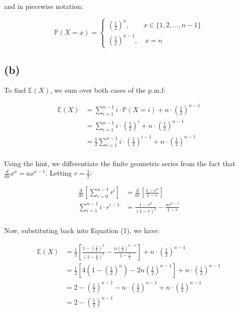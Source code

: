 \documentclass[12pt]{article}
\begin{document}
\noindent and in piecewise notation: 

\begin{equation*}
    \boxed{\mathbb{P}(X = x) = \begin{cases}
        \left(\displaystyle\frac{1}{2}\right)^{x}, \qquad x \in \{1, 2, \dots , n-1\} \\ 
        \left(\displaystyle\frac{1}{2}\right)^{x-1}, \quad x = n
    \end{cases}}
\end{equation*}


\subsection*{(b)}
To find $ \mathbb{E}(X)$, we sum over both cases of the p.m.f:

\begin{align}
    \mathbb{E}(X) &= \sum_{i=1}^{n-1} i \cdot \mathbb{P}(X = i) + n \cdot \left(\frac{1}{2}\right)^{n-1} \\ \nonumber
    &= \sum_{i=1}^{n-1} i \cdot \left(\frac{1}{2}\right)^{i} + n \cdot \left(\frac{1}{2}\right)^{n-1} \\ \nonumber
    &= \frac{1}{2 }\sum_{i=1}^{n-1} i \cdot \left(\frac{1}{2}\right)^{i-1} + n \cdot \left(\frac{1}{2}\right)^{n-1} \\ \nonumber
\end{align}

\noindent Using the hint, we differentiate the finite geometric series from the fact that $\frac{d}{dx} x^{a} = ax^{a-1}$. Letting $r = \frac{1}{2}$: 

\begin{align*}
    \frac{\text{d}}{\text{d}r} \left[\sum_{i=0}^{n-1} r^{i} \right] &= \frac{\text{d}}{\text{d}r} \left[\frac{1 - r^{n}}{1-r} \right]\\ 
    \sum_{i=1}^{n-1} i \cdot r ^{i-1} &= \frac{1-r^{n}}{(1-r)^{2}} - \frac{nr^{n-1}}{1-r} \\ 
\end{align*}

\noindent Now, substituting back into Equation (1), we have:

\begin{align*}
    \mathbb{E}(X) &= \frac{1}{2} \left[ \frac{1 - (\frac{1}{2})^{n}}{(1-\frac{1}{2})^{2}} - \frac{n(\frac{1}{2})^{n-1}}{1-\frac{1}{2}}\right] + n \cdot \left(\frac{1}{2}\right)^{n-1} \\ 
    &= \frac{1}{2} \left[4\left(1-\left(\frac{1}{2}\right)^{n}\right)-2n\left(\frac{1}{2}\right)^{n-1}\right] + n \cdot \left(\frac{1}{2}\right)^{n-1} \\
    &= 2- \left(\frac{1}{2}\right)^{n-1} - n\cdot\left(\frac{1}{2}\right)^{n-1} + n \cdot \left(\frac{1}{2}\right)^{n-1} \\
    &=  \boxed{2- \left(\frac{1}{2}\right)^{n-1}}
\end{align*}
\end{document}

